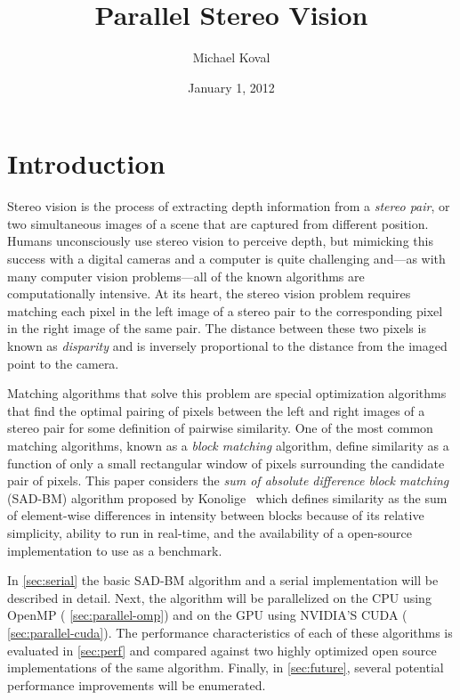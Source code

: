 \documentclass{article}
\title{Parallel Stereo Vision}
\author{Michael Koval}
\date{January 1, 2012}
\let\orgautoref\autoref
\providecommand{\Autoref}
        {\def\equationautorefname{Equation}%
         \def\figureautorefname{Figure}%
         \def\subfigureautorefname{Figure}%
         \def\Itemautorefname{Item}%
         \def\tableautorefname{Table}%
         \def\sectionautorefname{Section}%
         \def\subsectionautorefname{Section}%
         \def\subsubsectionautorefname{Section}%
         \def\chapterautorefname{Section}%
         \def\partautorefname{Part}%
         \orgautoref}
\begin{document}
\maketitle

\section{Introduction}
\label{sec:intro}
Stereo vision is the process of extracting depth information from a
\textit{stereo pair}, or two simultaneous images of a scene that are captured
from different position. Humans unconsciously use stereo vision to perceive
depth, but mimicking this success with a digital cameras and a computer is
quite challenging and---as with many computer vision problems---all of the
known algorithms are computationally intensive. At its heart, the stereo vision
problem requires matching each pixel in the left image of a stereo pair to the
corresponding pixel in the right image of the same pair. The distance between
these two pixels is known as \textit{disparity} and is inversely proportional
to the distance from the imaged point to the camera.

Matching algorithms that solve this problem are special optimization algorithms
that find the optimal pairing of pixels between the left and right images of a
stereo pair for some definition of pairwise similarity. One of the most common
matching algorithms, known as a \textit{block matching} algorithm, define
similarity as a function of only a small rectangular window of pixels
surrounding the candidate pair of pixels. This paper considers the \textit{sum
of absolute difference block matching} (SAD-BM) algorithm proposed by
Konolige~\cite{konolige97} which defines similarity as the sum of element-wise
differences in intensity between blocks because of its relative simplicity,
ability to run in real-time, and the availability of a open-source
implementation to use as a benchmark.

In \Autoref{sec:serial} the basic SAD-BM algorithm and a serial implementation
will be described in detail. Next, the algorithm will be parallelized on the
CPU using OpenMP (\Autoref{sec:parallel-omp}) and on the GPU using NVIDIA'S
CUDA (\Autoref{sec:parallel-cuda}). The performance characteristics of each of
these algorithms is evaluated in \Autoref{sec:perf} and compared against two
highly optimized open source implementations of the same algorithm. Finally, in
\Autoref{sec:future}, several potential performance improvements will be
enumerated.
\end{document}
